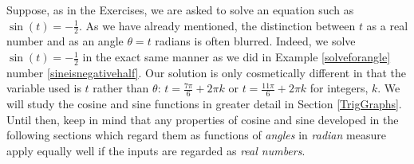 Suppose, as in the Exercises, we are asked to solve an equation such as $\sin(t) = -\frac{1}{2}$.  As we have already mentioned, the distinction between $t$ as a real number and as an angle $\theta = t$ radians is often blurred. Indeed, we solve $\sin(t) = -\frac{1}{2}$ in the exact same manner as we did in Example \ref{solveforangle} number \ref{sineisnegativehalf}.  Our solution is only cosmetically different in that the variable used is $t$ rather than $\theta$:  $t = \frac{7\pi}{6} + 2\pi k$ or  $t = \frac{11\pi}{6} + 2\pi k$ for integers, $k$.  We will study the cosine and sine functions in greater detail in Section \ref{TrigGraphs}.  Until then, keep in mind that any properties of cosine and sine developed in the following sections which regard them as functions of \textit{angles} in \textit{radian} measure apply equally well if the inputs are regarded as \textit{real numbers}.

